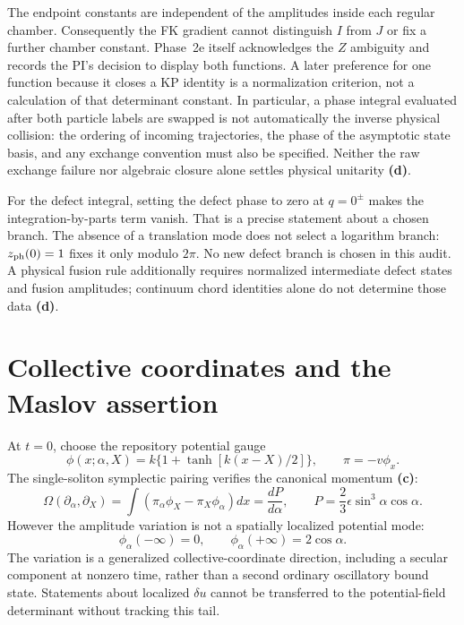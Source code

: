 \documentclass[11pt]{article}
\newcommand{\Lc}{\textbf{(c)}}
\newcommand{\Ld}{\textbf{(d)}}
\begin{document}
The endpoint constants are independent of the amplitudes inside each regular
chamber. Consequently the FK gradient cannot distinguish $I$ from $J$ or fix a
further chamber constant. Phase~2e itself acknowledges the $Z$ ambiguity and
records the PI's decision to display both functions. A later preference for
one function because it closes a KP identity is a normalization criterion,
not a calculation of that determinant constant. In particular, a phase
integral evaluated after both particle labels are swapped is not automatically
the inverse physical collision: the ordering of incoming trajectories, the
phase of the asymptotic state basis, and any exchange convention must also be
specified. Neither the raw exchange failure nor algebraic closure alone
settles physical unitarity \Ld.

For the defect integral, setting the defect phase to zero at $q=0^\pm$ makes
the integration-by-parts term vanish. That is a precise statement about a
chosen branch. The absence of a translation mode does not select a logarithm
branch: $z_{\rm ph}(0)=1$ fixes it only modulo $2\pi$. No new defect branch is
chosen in this audit. A physical fusion rule additionally requires normalized
intermediate defect states and fusion amplitudes; continuum chord identities
alone do not determine those data \Ld.

\section{Collective coordinates and the Maslov assertion}
At $t=0$, choose the repository potential gauge
\[
 \phi(x;\alpha,X)=k\{1+\tanh[k(x-X)/2]\},\qquad \pi=-v\phi_x.
\]
The single-soliton symplectic pairing verifies the canonical momentum \Lc:
\begin{equation}
 \Omega(\partial_\alpha,\partial_X)
 =\int(\pi_\alpha\phi_X-\pi_X\phi_\alpha)dx
 =\frac{dP}{d\alpha},\qquad
 P=\frac23\epsilon\sin^3\alpha\cos\alpha.\tag{c}
\end{equation}
However the amplitude variation is not a spatially localized potential mode:
\begin{equation}
 \phi_\alpha(-\infty)=0,\qquad
 \phi_\alpha(+\infty)=2\cos\alpha.\tag{c}
\end{equation}
The variation is a generalized collective-coordinate direction, including a
secular component at nonzero time, rather than a second ordinary oscillatory
bound state. Statements about localized $\delta u$ cannot be transferred to
the potential-field determinant without tracking this tail.
\end{document}
